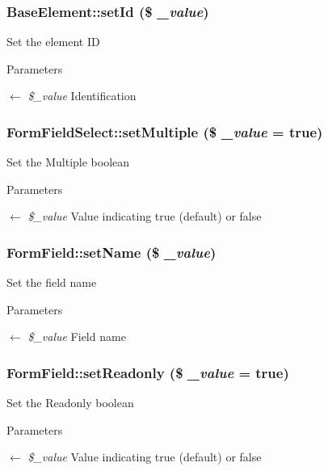 \subsubsection[{setId}]{\setlength{\rightskip}{0pt plus 5cm}BaseElement::setId (\$ {\em \_\-value})}\label{classBaseElement_a0c1ce3d1684ecb78960cf7a97278494e}
Set the element ID 
\begin{DoxyParams}{Parameters}
\item[\mbox{$\leftarrow$} {\em \$\_\-value}]Identification \end{DoxyParams}
\subsubsection[{setMultiple}]{\setlength{\rightskip}{0pt plus 5cm}FormFieldSelect::setMultiple (\$ {\em \_\-value} = {\ttfamily true})}\label{classFormFieldSelect_aa69374c1f0692d691e7899f3ed14a42e}
Set the Multiple boolean 
\begin{DoxyParams}{Parameters}
\item[\mbox{$\leftarrow$} {\em \$\_\-value}]Value indicating true (default) or false \end{DoxyParams}
\subsubsection[{setName}]{\setlength{\rightskip}{0pt plus 5cm}FormField::setName (\$ {\em \_\-value})}\label{classFormField_ad57e32bd53170af060e869b3b60f0ef7}
Set the field name 
\begin{DoxyParams}{Parameters}
\item[\mbox{$\leftarrow$} {\em \$\_\-value}]Field name \end{DoxyParams}
\subsubsection[{setReadonly}]{\setlength{\rightskip}{0pt plus 5cm}FormField::setReadonly (\$ {\em \_\-value} = {\ttfamily true})}\label{classFormField_a6eabbb35d24b1698ea25b66ddfd88a64}
Set the Readonly boolean 
\begin{DoxyParams}{Parameters}
\item[\mbox{$\leftarrow$} {\em \$\_\-value}]Value indicating true (default) or false \end{DoxyParams}
